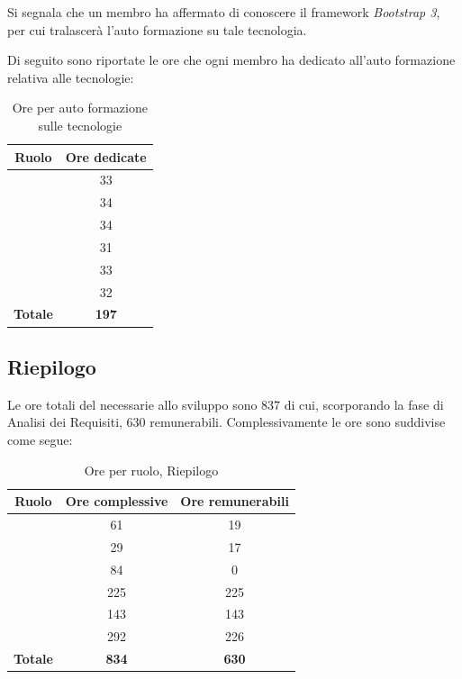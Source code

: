 Si segnala che un membro ha affermato di conoscere il framework \textit{Bootstrap 3}, per cui tralascerà l'auto formazione su tale tecnologia.

Di seguito sono riportate le ore che ogni membro ha dedicato all'auto formazione relativa alle tecnologie:

\begin{table}[H]
	\begin{center}
		\begin{tabular}{|c|c|}
			\hline
			\textbf{Ruolo}	& \textbf{Ore dedicate}  \\
			\hline
			\MC	&	33		\\
			\hline
			\DAN	&	34	\\
			\hline
			\AN	&	34		\\
			\hline
			\AS	&	31		\\
			\hline
			\NS	&	33		\\
			\hline
			\DS	&	32		\\
			\hline
			\textbf{Totale} & \textbf{197}  \\
			\hline
		\end{tabular}
	\end{center}
	\caption{Ore per auto formazione sulle tecnologie}
\end{table}


\subsection{Riepilogo}
Le ore totali del necessarie allo sviluppo sono 837 di cui, scorporando la fase di Analisi dei Requisiti, 630 remunerabili. Complessivamente le ore sono suddivise come segue:

\begin{table}[H]
	\begin{center}
		\begin{tabular}{|c|c|c|}
			\hline
			\textbf{Ruolo}	& \textbf{Ore complessive} & \textbf{Ore remunerabili} \\
			\hline
			\Res	&	61	&	19	\\
			\hline
			\Amm	&	29	&	17	\\
			\hline
			\Ana	&	84	&	0	\\
			\hline
			\Prog	&	225	&	225	\\
			\hline
			\Progr	&	143	&	143	\\
			\hline
			\Ver	&	292	&	226	\\
			\hline
			\textbf{Totale} & \textbf{834} & \textbf{630} \\
			\hline
		\end{tabular}
	\end{center}
	\caption{Ore per ruolo, Riepilogo}
\end{table}

